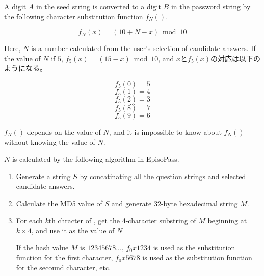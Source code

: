 \documentclass{article}
\begin{document}

A digit $A$ in the seed string is converted to a digit $B$
in the password string by the following
character substitution function $f_N()$.

\[ f_N(x) = (10 + N - x) \bmod 10 \]


Here, $N$ is a number calculated from the user's selection of
candidate answers.
If the value of $N$ if $5$, $f_5(x) = (15-x) \bmod 10$, and
$x$と$f_5(x)$の対応は以下のようになる。

\[ f_5(0) = 5 \]
\[ f_5(1) = 4 \]
\[ f_5(2) = 3 \]
\[ ... \]
\[ f_5(8) = 7 \]
\[ f_5(9) = 6 \]


$f_N()$ depends on the value of $N$, and
it is impossible to know about $f_N()$ without knowing the value of $N$.
 

$N$ is calculated by the following algorithm in EpisoPass.
 
\begin{enumerate}
  \item Generate a string $S$ by concatinating all the question strings and selected candidate answers.

    \vspace{-1mm}
  \item Calculate the MD5 value of $S$ and generate 32-byte hexadecimal string $M$.

    \vspace{-1mm}
  \item For each $k$th chracter of {\SS},
    get the 4-character substring of $M$ beginning at $k \times 4$, and use it as the value of $N$

    If the hash value $M$ is $12345678...$,
    $f_0x1234$ is used as the substitution function for the first character,
    $f_0x5678$ is used as the substitution function for the secound character, etc.
\end{enumerate}
\end{document}
